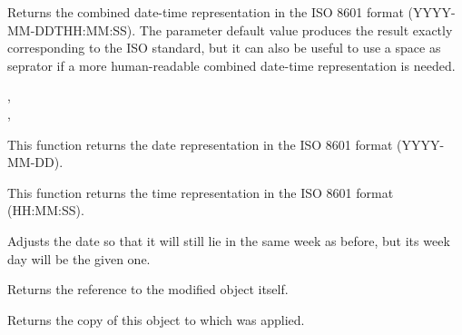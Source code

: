 Returns the combined date-time representation in the ISO 8601 format
(YYYY-MM-DDTHH:MM:SS). The  parameter default value produces the
result exactly corresponding to the ISO standard, but it can also be useful to
use a space as seprator if a more human-readable combined date-time
representation is needed.


,\\
,\\


\label{wxdatetimeformatisodate}


This function returns the date representation in the ISO 8601 format
(YYYY-MM-DD).


\label{wxdatetimeformatisotime}


This function returns the time representation in the ISO 8601 format
(HH:MM:SS).



\label{wxdatetimesettoweekdayinsameweek}


Adjusts the date so that it will still lie in the same week as before, but its
week day will be the given one.

Returns the reference to the modified object itself.


\label{wxdatetimegetweekdayinsameweek}


Returns the copy of this object to which
 was
applied.


\label{wxdatetimesettonextweekday}


